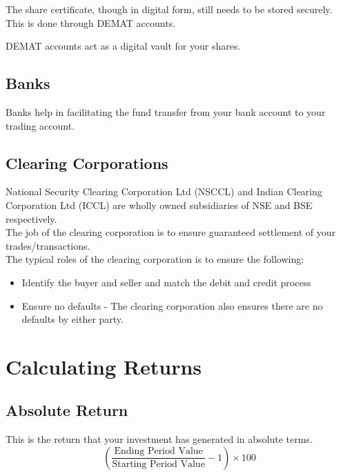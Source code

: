 The share certificate, though in digital form, still needs to be stored securely. This is done through DEMAT accounts.


DEMAT accounts act as a digital vault for your shares.

\subsection{Banks}
Banks help in facilitating the fund transfer from your bank account to your trading account.

\subsection{Clearing Corporations}
National Security Clearing Corporation Ltd (NSCCL) and Indian Clearing Corporation Ltd (ICCL) are wholly owned subsidiaries of NSE and BSE respectively.
\\
The job of the clearing corporation is to ensure guaranteed settlement of your trades/transactions.
\\
The typical roles of the clearing corporation is to ensure the following:
\begin{itemize}
  \item Identify the buyer and seller and match the debit and credit process
  \item Ensure no defaults - The clearing corporation also ensures there are no defaults by either party.
\end{itemize}

\section{Calculating Returns}

\subsection{Absolute Return}
This is the return that your investment has generated in absolute terms.
\[ \left( \frac{\textrm{Ending Period Value}}{\textrm{Starting Period Value}} - 1 \right) \times 100 \]

